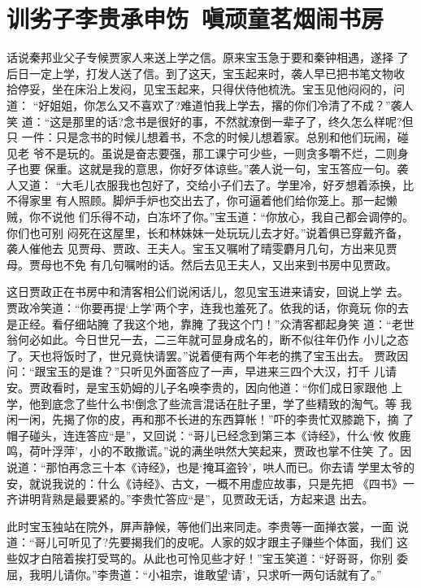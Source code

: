 \chapter{训劣子李贵承申饬~嗔顽童茗烟闹书房}

话说秦邦业父子专候贾家人来送上学之信。原来宝玉急于要和秦钟相遇，遂择
了后日一定上学，打发人送了信。到了这天，宝玉起来时，袭人早已把书笔文物收
拾停妥，坐在床沿上发闷，见宝玉起来，只得伏侍他梳洗。宝玉见他闷闷的，问道：
“好姐姐，你怎么又不喜欢了?难道怕我上学去，撂的你们冷清了不成？”袭人笑
道：“这是那里的话?念书是很好的事，不然就潦倒一辈子了，终久怎么样呢?但只
一件：只是念书的时候儿想着书，不念的时候儿想着家。总别和他们玩闹，碰见老
爷不是玩的。虽说是奋志要强，那工课宁可少些，一则贪多嚼不烂，二则身子也要
保重。这就是我的意思，你好歹体谅些。”袭人说一句，宝玉答应一句。袭人又道：
“大毛儿衣服我也包好了，交给小子们去了。学里冷，好歹想着添换，比不得家里
有人照顾。脚炉手炉也交出去了，你可逼着他们给你笼上。那一起懒贼，你不说他
们乐得不动，白冻坏了你。”宝玉道：“你放心，我自己都会调停的。你们也可别
闷死在这屋里，长和林妹妹一处玩玩儿去才好。”说着俱已穿戴齐备，袭人催他去
见贾母、贾政、王夫人。宝玉又嘱咐了晴雯麝月几句，方出来见贾母。贾母也不免
有几句嘱咐的话。然后去见王夫人，又出来到书房中见贾政。

这日贾政正在书房中和清客相公们说闲话儿，忽见宝玉进来请安，回说上学
去。贾政冷笑道：“你要再提‘上学’两个字，连我也羞死了。依我的话，你竟玩
你的去是正经。看仔细站腌了我这个地，靠腌了我这个门！”众清客都起身笑
道：“老世翁何必如此。今日世兄一去，二三年就可显身成名的，断不似往年仍作
小儿之态了。天也将饭时了，世兄竟快请罢。”说着便有两个年老的携了宝玉出去。
贾政因问：“跟宝玉的是谁？”只听见外面答应了一声，早进来三四个大汉，打千
儿请安。贾政看时，是宝玉奶姆的儿子名唤李贵的，因向他道：“你们成日家跟他
上学，他到底念了些什么书!倒念了些流言混话在肚子里，学了些精致的淘气。等
我闲一闲，先揭了你的皮，再和那不长进的东西算帐！”吓的李贵忙双膝跪下，摘
了帽子碰头，连连答应“是”，又回说：“哥儿已经念到第三本《诗经》，什么‘攸
攸鹿鸣，荷叶浮萍’，小的不敢撒谎。”说的满坐哄然大笑起来，贾政也掌不住笑
了。因说道：“那怕再念三十本《诗经》，也是‘掩耳盗铃’，哄人而已。你去请
学里太爷的安，就说我说的：什么《诗经》、古文，一概不用虚应故事，只是先把
《四书》一齐讲明背熟是最要紧的。”李贵忙答应“是”，见贾政无话，方起来退
出去。

此时宝玉独站在院外，屏声静候，等他们出来同走。李贵等一面掸衣裳，一面
说道：“哥儿可听见了?先要揭我们的皮呢。人家的奴才跟主子赚些个体面，我们
这些奴才白陪着挨打受骂的。从此也可怜见些才好！”宝玉笑道：“好哥哥，你别
委屈，我明儿请你。”李贵道：“小祖宗，谁敢望‘请’，只求听一两句话就有了。”


